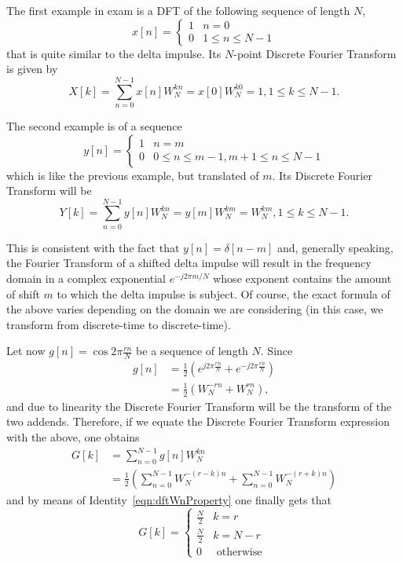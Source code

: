 \documentclass[\documentfontsize, twocolumn]{\classname}
\begin{document}
The first example in exam is a DFT of the following sequence of length $N$,
\[
    x[n] = \left\{\begin{array}{ll}
            1 & n=0\\
            0 & 1 \leq n \leq N-1
        \end{array}\right.
\]
that is quite similar to the delta impulse. Its $N$-point Discrete Fourier Transform is given by
\[
    X[k] = \sum_{n=0}^{N-1} x[n]W_N^{kn} = x[0]W_N^{k0} = 1, 1\leq k \leq N-1.
\]

The second example is of a sequence
\[
    y[n] = \left\{\begin{array}{ll}
            1 & n=m\\
            0 & 0\leq n \leq m-1, m+1 \leq n \leq N-1
        \end{array}\right.
\]
which is like the previous example, but translated of $m$. Its Discrete Fourier Transform will be
\[
    Y[k] = \sum_{n=0}^{N-1} y[n]W_N^{kn} = y[m]W_N^{km} = W_N^{km}, 1\leq k \leq N-1.
\]

This is consistent with the fact that $y[n] = \delta[n-m]$ and, generally speaking, the Fourier Transform of a shifted delta impulse will result in the frequency domain in a complex exponential $e^{-j2\pi m/N}$ whose exponent contains the amount of shift $m$ to which the delta impulse is subject. Of course, the exact formula of the above varies depending on the domain we are considering (in this case, we transform from discrete-time to discrete-time).

Let now $g[n] = \cos{2\pi \frac{rn}{N}}$ be a sequence of length $N$. Since
\begin{align*}
    g[n] &= \frac 1 2 \left(e^{j2\pi \frac{rn}{N}} + e^{-j2\pi \frac{rn}{N}}\right)\\
         &= \frac 1 2 \left(W_N^{-rn} + W_N^{rn}\right),
\end{align*}
and due to linearity the Discrete Fourier Transform will be the transform of the two addends. Therefore, if we equate the Discrete Fourier Transform expression with the above, one obtains
\begin{align*}
    G[k] &= \sum_{n=0}^{N-1} g[n] W_N^{kn} \\
         &= \frac 1 2 \left(\sum_{n=0}^{N-1} W_N^{-(r-k)n} + \sum_{n=0}^{N-1} W_N^{-(r+k)n}\right)
\end{align*}
and by means of Identity~\ref{eqn:dftWnProperty} one finally gets that
\[
    G[k] = \left\{\begin{array}{ll}
            \frac N 2 & k = r\\
            \frac N 2 & k = N - r\\
            0         & \mbox{ otherwise }
    \end{array}\right.
\]
\end{document}
